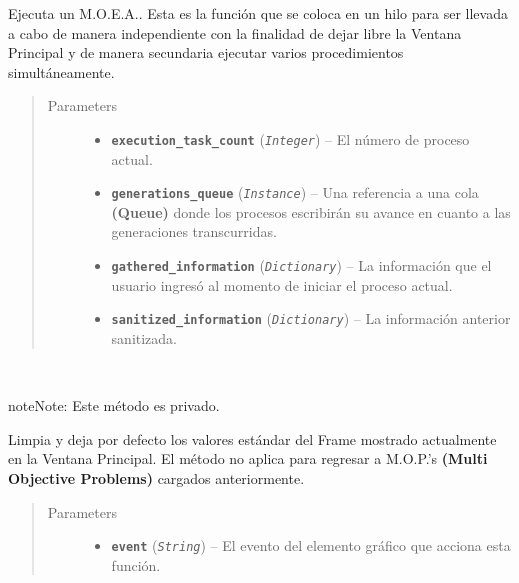 \documentclass[class=report, crop=false]{standalone}
\begin{document}
\begin{fulllineitems}
\begin{fulllineitems}
Ejecuta un M.O.E.A..\break
Esta es la función que se coloca en un hilo para ser llevada a 
cabo de manera independiente con la finalidad de dejar libre la 
Ventana Principal y de manera secundaria ejecutar varios 
procedimientos simultáneamente.

\begin{quote}\begin{description}
\item[{Parameters}] \leavevmode\begin{itemize}
\item \textbf{\texttt{execution\_task\_count}} (\emph{\texttt{Integer}}) -- El número de proceso actual.
\item \textbf{\texttt{generations\_queue}} (\emph{\texttt{Instance}}) -- Una referencia a una cola \textbf{(Queue)} donde los procesos escribirán su avance
en cuanto a las generaciones transcurridas.
\item \textbf{\texttt{gathered\_information}} (\emph{\texttt{Dictionary}}) -- La información que el usuario ingresó al momento de iniciar el proceso actual.
\item \textbf{\texttt{sanitized\_information}} (\emph{\texttt{Dictionary}}) -- La información anterior sanitizada.
\end{itemize}
\end{description}\end{quote}

\end{fulllineitems}

\begin{fulllineitems}

~

\begin{notice}{note}{Note:}
Este método es privado.
\end{notice}

Limpia y deja por defecto los valores estándar del Frame
mostrado actualmente en la Ventana Principal.\break
El método no aplica para regresar a M.O.P.'s \textbf{(Multi Objective Problems)}
cargados anteriormente.

\begin{quote}\begin{description}
\item[{Parameters}] \leavevmode\begin{itemize}
\item \textbf{\texttt{event}} (\emph{\texttt{String}}) -- El evento del elemento gráfico que acciona esta función.
\end{itemize}
\end{description}\end{quote}


\end{fulllineitems}
\end{fulllineitems}
\end{document}
